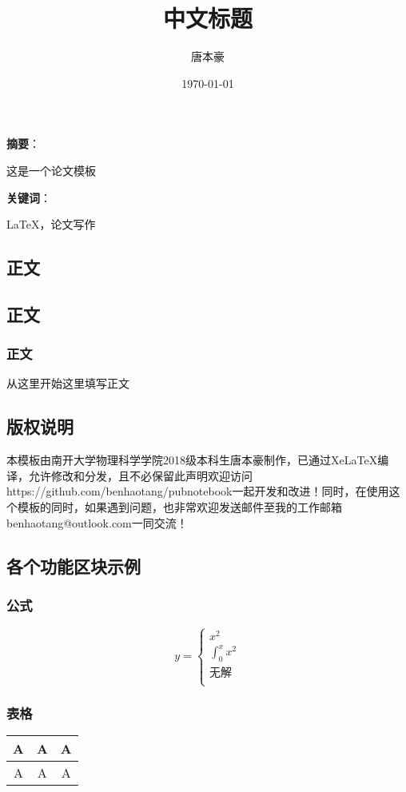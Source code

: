 \documentclass{article}
\title{\vspace{-30mm}\Huge\heiti 中文标题}
\author[1]{唐本豪}
\affil[1]{南开大学物理科学学院,天津}
\date{\today}
\renewenvironment{abstract}{
	\textbf{摘要}：
}{\par}
\newenvironment{keyword}{
	\textbf{关键词}：
}{}
\begin{document}
\maketitle
\begin{abstract}
    这是一个论文模板
\end{abstract} 
\begin{keyword}
	\LaTeX{}，论文写作
\end{keyword}
\begin{multicols}{2}
\section{正文}
\subsection{正文}
\subsubsection{正文}
从这里开始这里填写正文\par
\subsection{版权说明}
本模板由南开大学物理科学学院2018级本科生唐本豪制作，已通过XeLaTeX编译，允许修改和分发，且不必保留此声明\cite{web}欢迎访问https://github.com/benhaotang/pubnotebook一起开发和改进！同时，在使用这个模板的同时，如果遇到问题，也非常欢迎发送邮件至我的工作邮箱benhaotang@outlook.com一同交流！
\subsection{各个功能区块示例}
\subsubsection{公式}
\begin{equation}
    y = \left\{ \begin{array}{c}
        x^2\\
        \int^x_0{x^2}\\
        \text{无解}\\
    \end{array} \right.
\end{equation}
\subsubsection{表格}
\begin{center}
    \begin{tabular}{ccc}
        \hline
		A & A & A \\ \hline
		A & A & A \\ \hline
  \end{tabular}
  \label{tab:haha}
\end{center}

\end{multicols}
\end{document}
